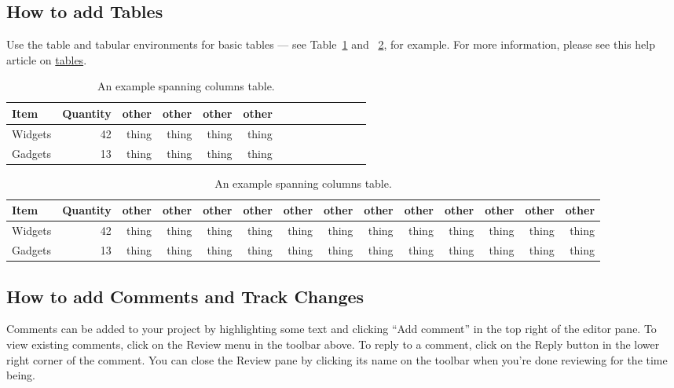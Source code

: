 \documentclass[twocolumn, 9pt]{extarticle}
\begin{document}
\subsection{How to add Tables}

Use the table and tabular environments for basic tables --- see Table~\ref{tab:widgets} and ~\ref{tab:widgets_wide}, for example. For more information, please see this help article on \href{https://www.overleaf.com/learn/latex/tables}{tables}. 

\begin{table}[ht]
\centering
\begin{tabular}{l|r|r|r|r|r|r|r|r|r|r|r|r|r}
Item & Quantity & other & other & other & other  \\\hline
Widgets & 42 & thing & thing & thing & thing  \\
Gadgets & 13 & thing & thing & thing & thing 
\end{tabular}
\caption{\label{tab:widgets}An example spanning columns table.}
\end{table}



\begin{table}[ht]
\centering
\begin{tabular}{l|r|r|r|r|r|r|r|r|r|r|r|r|r}
Item & Quantity & other & other & other & other & other & other & other & other  & other & other & other & other  \\\hline
Widgets & 42 & thing & thing & thing & thing & thing & thing & thing & thing & thing & thing & thing & thing \\
Gadgets & 13 & thing & thing & thing & thing & thing & thing & thing & thing & thing & thing & thing & thing
\end{tabular}
\caption{\label{tab:widgets_wide}An example spanning columns table.}
\end{table}

\subsection{How to add Comments and Track Changes}

Comments can be added to your project by highlighting some text and clicking ``Add comment'' in the top right of the editor pane. To view existing comments, click on the Review menu in the toolbar above. To reply to a comment, click on the Reply button in the lower right corner of the comment. You can close the Review pane by clicking its name on the toolbar when you're done reviewing for the time being.
\end{document}
